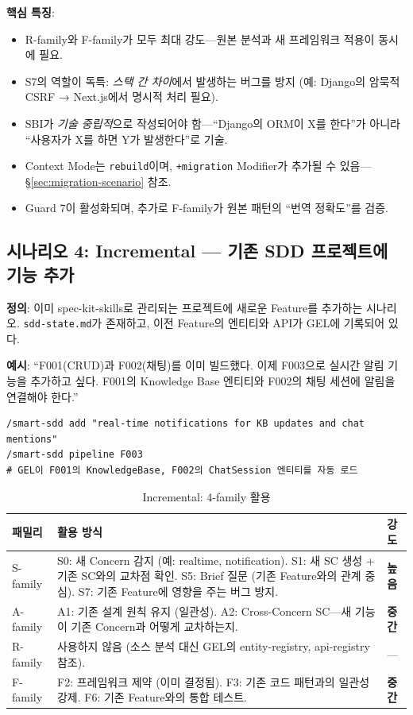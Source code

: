 \documentclass[11pt,a4paper,openright,twoside]{report}
\begin{document}
\textbf{핵심 특징}:
\begin{itemize}[nosep]
  \item R-family와 F-family가 모두 최대 강도---원본 분석과 새 프레임워크 적용이 동시에 필요.
  \item S7의 역할이 독특: \emph{스택 간 차이}에서 발생하는 버그를 방지 (예: Django의 암묵적 CSRF → Next.js에서 명시적 처리 필요).
  \item SBI가 \emph{기술 중립적}으로 작성되어야 함---``Django의 ORM이 X를 한다''가 아니라 ``사용자가 X를 하면 Y가 발생한다''로 기술.
  \item Context Mode는 \texttt{rebuild}이며, \texttt{+migration} Modifier가 추가될 수 있음---\S\ref{sec:migration-scenario} 참조.
  \item Guard 7이 활성화되며, 추가로 F-family가 원본 패턴의 ``번역 정확도''를 검증.
\end{itemize}


\subsection{시나리오 4: Incremental --- 기존 SDD 프로젝트에 기능 추가}
\label{sec:ref-incremental}

\textbf{정의}: 이미 spec-kit-skills로 관리되는 프로젝트에 새로운 Feature를 추가하는 시나리오. \texttt{sdd-state.md}가 존재하고, 이전 Feature의 엔티티와 API가 GEL에 기록되어 있다.

\textbf{예시}: ``F001(CRUD)과 F002(채팅)를 이미 빌드했다. 이제 F003으로 실시간 알림 기능을 추가하고 싶다. F001의 Knowledge Base 엔티티와 F002의 채팅 세션에 알림을 연결해야 한다.''

\begin{lstlisting}
/smart-sdd add "real-time notifications for KB updates and chat mentions"
/smart-sdd pipeline F003
# GEL이 F001의 KnowledgeBase, F002의 ChatSession 엔티티를 자동 로드
\end{lstlisting}

\begin{table}[H]
\centering
\caption{Incremental: 4-family 활용}
\label{tab:ref-incremental}
\begin{tabularx}{\textwidth}{lXl}
\toprule
\textbf{패밀리} & \textbf{활용 방식} & \textbf{강도} \\
\midrule
S-family &
  S0: 새 Concern 감지 (예: realtime, notification). S1: 새 SC 생성 + 기존 SC와의 교차점 확인. S5: Brief 질문 (기존 Feature와의 관계 중심). S7: 기존 Feature에 영향을 주는 버그 방지. &
  \textbf{높음} \\
\addlinespace
A-family &
  A1: 기존 설계 원칙 유지 (일관성). A2: Cross-Concern SC---새 기능이 기존 Concern과 어떻게 교차하는지. &
  \textbf{중간} \\
\addlinespace
R-family &
  사용하지 않음 (소스 분석 대신 GEL의 entity-registry, api-registry 참조). &
  --- \\
\addlinespace
F-family &
  F2: 프레임워크 제약 (이미 결정됨). F3: 기존 코드 패턴과의 일관성 강제. F6: 기존 Feature와의 통합 테스트. &
  \textbf{중간} \\
\bottomrule
\end{tabularx}
\end{table}
\end{document}
